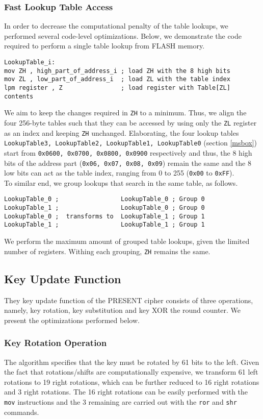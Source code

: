 \documentclass[11pt]{article}
\begin{document}
\subsubsection{Fast Lookup Table Access}
In order to decrease the computational penalty of the table lookups, we performed several code-level optimizations. Below, we demonstrate the code required to perform a single table lookup from FLASH memory.
\begin{verbatim}
LookupTable_i:
mov ZH , high_part_of_address_i ; load ZH with the 8 high bits
mov ZL , low_part_of_address_i  ; load ZL with the table index
lpm register , Z 				; load register with Table[ZL] contents
\end{verbatim}
We aim to keep the changes required in \texttt{ZH} to a minimum. Thus, we align the four 256-byte tables such that they can be accessed by using only the  \texttt{ZL} register as an index and keeping \texttt{ZH} unchanged. Elaborating, the four lookup tables \texttt{LookupTable3, LookupTable2, LookupTable1, LookupTable0} (section \ref{msbox}) start from \texttt{0x0600, 0x0700, 0x0800, 0x0900} respectively and thus, the 8 high bits of the address part (\texttt{0x06, 0x07, 0x08, 0x09}) remain the same and the 8 low bits can act as the table index, ranging from 0 to 255 (\texttt{0x00} to \texttt{0xFF}). \\
To similar end, we group lookups that search in the same table, as follows.
\begin{verbatim}
LookupTable_0 ;	                LookupTable_0 ; Group 0 
LookupTable_1 ;	                LookupTable_0 ; Group 0
LookupTable_0 ;  transforms to  LookupTable_1 ; Group 1
LookupTable_1 ;	                LookupTable_1 ; Group 1
\end{verbatim}
We perform the maximum amount of grouped table lookups, given the limited number of registers. Withing each grouping, \texttt{ZH} remains the same.
\subsection{Key Update Function}
They key update function of the PRESENT cipher consists of three operations, namely, key rotation, key substitution and key XOR the round counter. We present the optimizations performed below.
\subsubsection{Key Rotation Operation}
The algorithm specifies that the key must be rotated by 61 bits to the left. Given the fact that rotations/shifts are computationally expensive, we transform 61 left rotations to 19 right rotations, which can be further reduced to 16 right rotations and 3 right rotations. The 16 right rotations can be easily performed with the \texttt{mov} instructions and the 3 remaining are carried out with the \texttt{ror} and \texttt{shr} commands.
\end{document}
